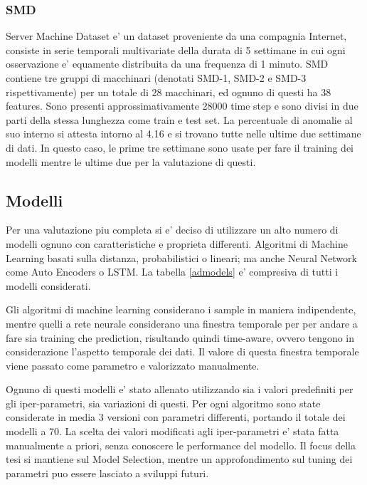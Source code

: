 \subsubsection{SMD}
Server Machine Dataset e' un dataset proveniente da una compagnia Internet, consiste in serie temporali multivariate della durata di 5 settimane in cui ogni osservazione e' equamente distribuita da una frequenza di 1 minuto. SMD contiene tre gruppi di macchinari (denotati SMD-1, SMD-2 e SMD-3 rispettivamente) per un totale di 28 macchinari, ed ognuno di questi ha 38 features. Sono presenti approssimativamente 28000 time step e sono divisi in due parti della stessa lunghezza come train e test set. 
La percentuale di anomalie al suo interno si attesta intorno al 4.16 e si trovano tutte nelle ultime due settimane di dati. In questo caso, le prime tre settimane sono usate per fare il training dei modelli mentre le ultime due per la valutazione di questi.



\subsection{Modelli}
Per una valutazione piu completa si e' deciso di utilizzare un alto numero di modelli ognuno con caratteristiche e proprieta differenti. Algoritmi di Machine Learning basati sulla distanza, probabilistici o lineari; ma anche Neural Network come Auto Encoders o LSTM. La tabella \ref{admodels} e' compresiva di tutti i modelli considerati.

Gli algoritmi di machine learning considerano i sample in maniera indipendente, mentre quelli a rete neurale considerano una finestra temporale per per andare a fare sia training che prediction, risultando quindi time-aware, ovvero tengono in considerazione l'aspetto temporale dei dati. Il valore di questa finestra temporale viene passato come parametro e valorizzato manualmente.

Ognuno di questi modelli e' stato allenato utilizzando sia i valori predefiniti per gli iper-parametri, sia variazioni di questi. 
Per ogni algoritmo sono state considerate in media 3 versioni con parametri differenti, portando il totale dei modelli a 70.
La scelta dei valori modificati agli iper-parametri e' stata fatta manualmente a priori, senza conoscere le performance del modello. Il focus della tesi si mantiene sul Model Selection, mentre un approfondimento sul tuning dei parametri puo essere lasciato a sviluppi futuri.

